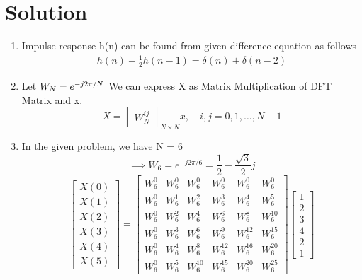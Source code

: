 \documentclass[journal,12pt,twocolumn]{IEEEtran}
\renewcommand\thesection{\arabic{section}}
\begin{document}
\section{Solution}
\begin{enumerate}[label=\thesection.\arabic*.,ref=\thesection.\theenumi]
\item
Impulse response h(n) can be found from given difference equation as follows
\begin{align}
    h(n) + \frac{1}{2}h(n-1) = \delta(n) + \delta(n-2)	
\end{align}

\item
Let $W_{N} = e^{-j2\pi/N} \\$ 
We can express X as Matrix Multiplication of DFT Matrix and x.
\begin{equation}
X = 
\begin{bmatrix}
W^{ij}_{N} 
\end{bmatrix}_{N \times N}
x, \quad i,j = 0,1, \ldots, N-1
\end{equation}
\item
In the given problem, we have N = 6
\begin{equation}
\implies W_{6} = e^{-j2\pi/6} = \frac{1}{2}-\frac{\sqrt{3}}{2}j 
\end{equation}
\begin{equation}
\begin{bmatrix} 
X(0) \\ 
X(1) \\ 
X(2) \\ 
X(3) \\ 
X(4) \\ 
X(5) 
\end{bmatrix}
=
\begin{bmatrix}
W^{0}_{6} & W^{0}_{6} & W^{0}_{6} & W^{0}_{6} & W^{0}_{6} & W^{0}_{6}\\
W^{0}_{6} & W^{1}_{6} & W^{2}_{6} & W^{3}_{6} & W^{4}_{6} & W^{5}_{6}\\
W^{0}_{6} & W^{2}_{6} & W^{4}_{6} & W^{6}_{6} & W^{8}_{6} & W^{10}_{6}\\
W^{0}_{6} & W^{3}_{6} & W^{6}_{6} & W^{9}_{6} & W^{12}_{6} & W^{15}_{6}\\
W^{0}_{6} & W^{4}_{6} & W^{8}_{6} & W^{12}_{6} & W^{16}_{6} & W^{20}_{6}\\
W^{0}_{6} & W^{5}_{6} & W^{10}_{6} & W^{15}_{6} & W^{20}_{6} & W^{25}_{6} 
\end{bmatrix}
\begin{bmatrix}
1 \\ 
2 \\ 
3 \\ 
4 \\ 
2 \\ 
1
\end{bmatrix}
\end{equation}


\end{enumerate}
\end{document}
